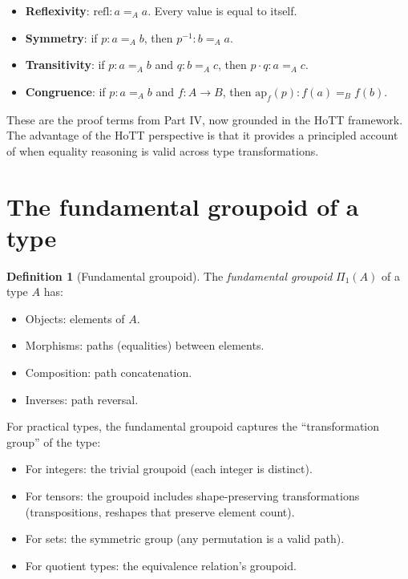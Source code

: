 \documentclass[11pt]{report}
\theoremstyle{definition}
\newtheorem{definition}{Definition}[section]
\theoremstyle{plain}
\begin{document}
\begin{itemize}[nosep]
  \item \textbf{Reflexivity}: $\mathrm{refl} : a =_A a$. Every value is
        equal to itself.
  \item \textbf{Symmetry}: if $p : a =_A b$, then $p^{-1} : b =_A a$.
  \item \textbf{Transitivity}: if $p : a =_A b$ and $q : b =_A c$, then
        $p \cdot q : a =_A c$.
  \item \textbf{Congruence}: if $p : a =_A b$ and $f : A \to B$, then
        $\mathrm{ap}_f(p) : f(a) =_B f(b)$.
\end{itemize}

These are the proof terms from Part IV, now grounded in the HoTT framework.
The advantage of the HoTT perspective is that it provides a principled account
of when equality reasoning is valid across type transformations.

\section{The fundamental groupoid of a type}

\begin{definition}[Fundamental groupoid]
The \emph{fundamental groupoid} $\Pi_1(A)$ of a type $A$ has:
\begin{itemize}[nosep]
  \item Objects: elements of $A$.
  \item Morphisms: paths (equalities) between elements.
  \item Composition: path concatenation.
  \item Inverses: path reversal.
\end{itemize}
\end{definition}

For practical types, the fundamental groupoid captures the ``transformation
group'' of the type:
\begin{itemize}[nosep]
  \item For integers: the trivial groupoid (each integer is distinct).
  \item For tensors: the groupoid includes shape-preserving transformations
        (transpositions, reshapes that preserve element count).
  \item For sets: the symmetric group (any permutation is a valid path).
  \item For quotient types: the equivalence relation's groupoid.
\end{itemize}
\end{document}
